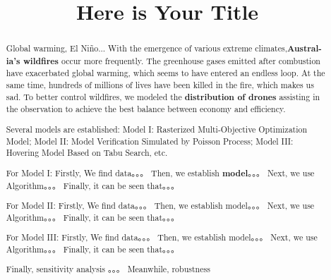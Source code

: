 \documentclass[12pt]{ctexart}
\title{Here is Your Title}  %
\begin{document}
\begin{abstract}
	Global warming, El Niño... With the emergence of various extreme climates,\textbf{Austral-ia's wildfires} occur more frequently. The greenhouse gases emitted after combustion have exacerbated global warming, which seems to have entered an endless loop. At the same time, hundreds of millions of lives have been killed in the fire, which makes us sad. To better control wildfires, we modeled the \textbf{distribution of drones} assisting in the observation to achieve the best balance between economy and efficiency.

	Several models are established: Model I: Rasterized Multi-Objective Optimization Model; Model II: Model Verification Simulated by Poisson Process; Model III: Hovering Model Based on Tabu Search, etc.

	For Model I:
	Firstly,%
	We find data。。。
	Then,%
	we establish \textbf{model}。。。
	Next,%
	we use Algorithm。。。
	Finally,%
	it can be seen that。。。

	For Model II:
	Firstly,%
	We find data。。。
	Then,%
	we establish model。。。
	Next,%
	we use Algorithm。。。
	Finally,%
	it can be seen that。。。

	For Model III:
	Firstly,%
	We find data。。。
	Then,%
	we establish model。。。
	Next,%
	we use Algorithm。。。
	Finally,%
	it can be seen that。。。

	Finally, sensitivity analysis 。。。 Meanwhile, robustness


\end{abstract}
\end{document}

